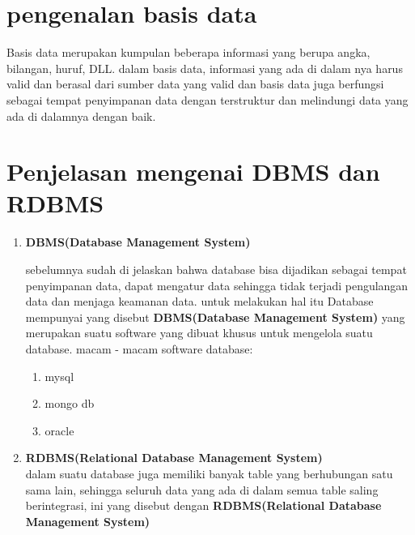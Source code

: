 \documentclass[a4paper,12pt]{article}
\begin{document}
        \section{\textbf{pengenalan basis data}}

         \par Basis data merupakan kumpulan beberapa informasi yang berupa angka, bilangan, huruf, DLL. dalam basis data, informasi yang ada di dalam nya harus valid dan berasal dari sumber data yang valid dan basis data juga berfungsi sebagai tempat penyimpanan data dengan terstruktur dan melindungi data yang ada di dalamnya dengan baik.
        \vspace{-0.5cm}
        \section{\textbf{Penjelasan mengenai DBMS dan RDBMS}}
        \begin{enumerate}
          \item \textbf{DBMS(Database Management System)}\\
          \vspace{-0.5cm}
          \par sebelumnya sudah di jelaskan bahwa database bisa dijadikan sebagai tempat penyimpanan data, dapat mengatur data sehingga tidak terjadi pengulangan data dan menjaga keamanan data. untuk melakukan hal itu Database mempunyai yang disebut \textbf{DBMS(Database Management System)} yang merupakan suatu software yang dibuat khusus untuk mengelola suatu database. macam - macam software database:\\
          \vspace{-0.5cm}
          \begin{enumerate}
            \item mysql
            \item mongo db
            \item oracle
          \end{enumerate}
          \newpage
          \item \textbf{RDBMS(Relational Database Management System)}\\
          \vspace{-0.7cm}
          \justify dalam suatu database juga memiliki banyak table yang berhubungan satu sama lain, sehingga seluruh data yang ada di dalam semua table saling berintegrasi, ini yang disebut dengan \textbf{RDBMS(Relational Database Management System)}
        \end{enumerate}
    
\end{document}
